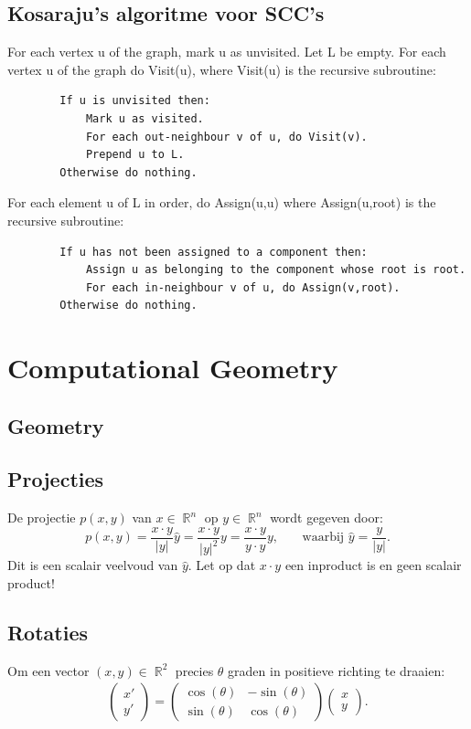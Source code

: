 \documentclass[10pt,a4paper,titlepage]{article}
\DeclareMathOperator{\R}{\mathbb{R}}
\begin{document}
\subsection{Kosaraju's algoritme voor SCC's}
For each vertex u of the graph, mark u as unvisited. Let L be empty. For each vertex u of the graph do Visit(u), where Visit(u) is the recursive subroutine:
\begin{verbatim}
        If u is unvisited then:
            Mark u as visited.
            For each out-neighbour v of u, do Visit(v).
            Prepend u to L.
        Otherwise do nothing.
\end{verbatim}
For each element u of L in order, do Assign(u,u) where Assign(u,root) is the recursive subroutine:
\begin{verbatim}
        If u has not been assigned to a component then:
            Assign u as belonging to the component whose root is root.
            For each in-neighbour v of u, do Assign(v,root).
        Otherwise do nothing.
\end{verbatim}
\fi

\iftrue
\section{Computational Geometry}

\subsection{Geometry}


\iftrue
\subsection{Projecties}

De projectie $p(x,y)$ van $x\in\R^n$ op $y\in\R^n$ wordt gegeven door:
\[ \text{$p(x,y) = \frac{x\cdot y}{|y|}\hat{y} = \frac{x\cdot y}{|y|^2}y = \frac{x\cdot y}{y\cdot y}y$, ~~~~ waarbij $\hat{y} = \frac{y}{|y|}$.}\]
Dit is een scalair veelvoud van $\hat{y}$. Let op dat $x\cdot y$ een inproduct is en geen scalair product!

\subsection{Rotaties}
Om een vector $(x,y)\in\R^2$ precies $\theta$ graden in positieve richting te draaien:
\begin{align*}
	\begin{pmatrix}
		x' \\
		y'
	\end{pmatrix} = \begin{pmatrix}
		\cos(\theta) & -\sin(\theta) \\
		\sin(\theta) & \cos(\theta)
	\end{pmatrix}\begin{pmatrix}
		x \\
		y
	\end{pmatrix}.
\end{align*}
\end{document}
